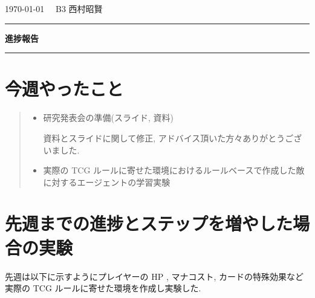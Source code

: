 \documentclass{jarticle}     %
\begin{document}
  \noindent
  \onecolumn
  \hspace{1em}

  \today
  \hfill
  \ \  B3 西村昭賢 

  \vspace{2mm}
  \hrule
  \begin{center}
  {\Large \bf 進捗報告}
  \end{center}
  \hrule
  \vspace{3mm}


\section{今週やったこと}

\begin{quote}
  \begin{itemize}
   \item 研究発表会の準備(スライド, 資料)
   \par
   資料とスライドに関して修正, アドバイス頂いた方々ありがとうございました.
   \item 実際の TCG ルールに寄せた環境におけるルールベースで作成した敵に対するエージェントの学習実験
  \end{itemize}
 \end{quote}

\section{先週までの進捗とステップを増やした場合の実験}
先週は以下に示すようにプレイヤーの HP , マナコスト, カードの特殊効果など実際の TCG ルールに寄せた環境を作成し実験した.
\end{document}
